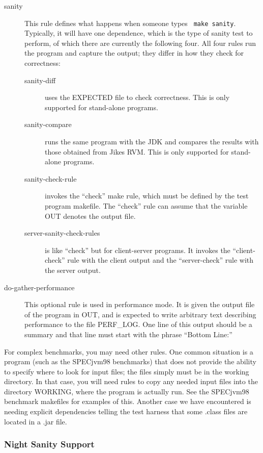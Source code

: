 \begin{description}
\begin{description}
\item[sanity] This rule defines what happens when someone types {\tt
make sanity}.  Typically, it will have one dependence, which is the type
of sanity test to perform, of which there are currently the following
four.  All four rules run the program and capture the output; they
differ in how they check for correctness:
\begin{description}
\item[sanity-diff] uses the EXPECTED file to check correctness.  This
is only supported for stand-alone programs.
\item[sanity-compare] runs the same program with the JDK and compares
the results with those obtained from Jikes RVM.  This is only supported for
stand-alone programs. 
\item[sanity-check-rule] invokes the ``check'' make rule, which must be
defined by the test program makefile.  The ``check'' rule can assume
that the variable OUT denotes the output file.
\item[server-sanity-check-rules] is like ``check'' but for
client-server programs.  It invokes the ``client-check'' rule with the
client output and the ``server-check'' rule with the server output.
\end{description}

\item[do-gather-performance]  This optional rule is used in
performance mode.  It is given the output file of the program in OUT,
and is expected to write arbitrary text describing performance to the
file PERF\_LOG.  One line of this output should be a summary and that
line must start with the phrase ``Bottom Line:''

\end{description}

For complex benchmarks, you may need other rules.  One common
situation is a program (such as the SPECjvm98 benchmarks)
that does not provide the ability to specify where to look for input
files; the files simply must be in the working directory.  In that
case, you will need rules to copy any needed input files into the
directory WORKING, where the program is actually run.  See the SPECjvm98
benchmark makefiles for examples of this.  Another case we have
encountered is needing explicit dependencies telling the test harness
that some .class files are located in a .jar file.

\end{description}

\subsubsection{Night Sanity Support}

